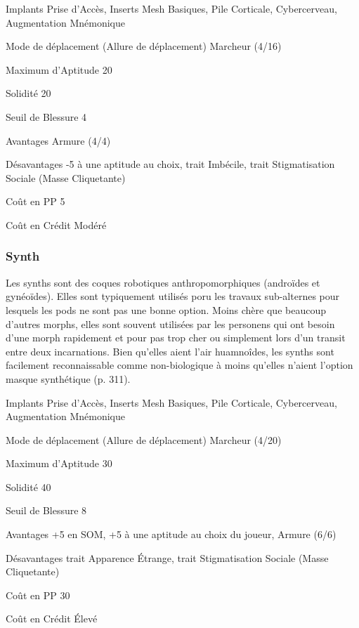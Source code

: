 \begin{description*} \item[Implants] Prise d'Accès, Inserts Mesh Basiques, Pile Corticale, Cybercerveau, Augmentation Mnémonique\item[Mode de déplacement](Allure de déplacement) Marcheur (4/16)\item[Maximum d'Aptitude] 20 \item[Solidité] 20 \item[Seuil de Blessure] 4 \item[Avantages] Armure (4/4)\item[Désavantages] -5 à une aptitude au choix, trait Imbécile, trait Stigmatisation Sociale (Masse Cliquetante) \item [Coût en PP] 5 \item[Coût en Crédit] Modéré \end{description*} 

\subsubsection{Synth} \label{sec:starting-synths} 

Les synths sont des coques robotiques anthropomorphiques (androïdes et gynéoïdes). Elles sont typiquement utilisés poru les travaux sub-alternes pour lesquels les pods ne sont pas une bonne option. Moins chère que beaucoup d'autres morphs, elles sont souvent utilisées par les personens qui ont besoin d'une morph rapidement et pour pas trop cher ou simplement lors d'un transit entre deux incarnations. Bien qu'elles aient l'air huamnoîdes, les synths sont facilement reconnaissable comme non-biologique à moins qu'elles n'aient l'option masque synthétique (p. 311). 

\begin{description*} \item[Implants] Prise d'Accès, Inserts Mesh Basiques, Pile Corticale, Cybercerveau, Augmentation Mnémonique\item[Mode de déplacement](Allure de déplacement) Marcheur (4/20)\item[Maximum d'Aptitude] 30 \item[Solidité] 40 \item[Seuil de Blessure] 8 \item[Avantages] +5 en SOM, +5 à une aptitude au choix du joueur, Armure (6/6)\item[Désavantages] trait Apparence Étrange, trait Stigmatisation Sociale (Masse Cliquetante) \item [Coût en PP] 30 \item[Coût en Crédit] Élevé \end{description*} 

